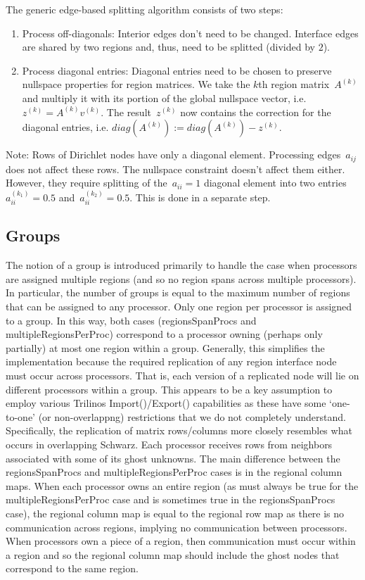 \documentclass[11pt]{article}
\begin{document}
The generic edge-based splitting algorithm consists of two steps:
\begin{enumerate}
\item Process off-diagonals: Interior edges don't need to be changed. 
Interface edges are shared by two regions and, thus, need to be splitted (divided by $2$).
\item Process diagonal entries: Diagonal entries need to be chosen to preserve
nullspace properties for region matrices. We take the $k$th region matrix~$A^{(k)}$ 
and multiply it with its portion of the global nullspace vector, i.e. $z^{(k)} = A^{(k)}v^{(k)}$. 
The result~$z^{(k)}$ now contains the correction for the diagonal entries, i.e. $diag{(A^{(k)})} := diag{(A^{(k)})} - z^{(k)}$.
\end{enumerate}

Note: Rows of Dirichlet nodes have only a diagonal element. Processing edges~$a_{ij}$ does not affect these rows. 
The nullspace constraint doesn't affect them either. However, they require splitting of the~$a_{ii} = 1$ diagonal element 
into two entries~$a_{ii}^{(k_1)} = 0.5$ and~$a_{ii}^{(k_2)} = 0.5$. This is done in a separate step.

\subsection{Groups}
The notion of a group is introduced primarily to handle the case when
processors are assigned multiple regions (and so no region spans
across multiple processors). In particular, the number of groups is
equal to the maximum number of regions that can be assigned to
any processor. Only one region per processor is assigned to a group.
In this way, both cases ({\sf regionsSpanProcs} and
{\sf multipleRegionsPerProc}) correspond to a processor owning (perhaps only
partially) at most one region within a group.
Generally, this simplifies the implementation because the required
replication of any region interface node must occur across processors.
That is, each version of a replicated node will lie on different
processors within a group. This appears to be a key assumption to employ various
Trilinos {\sf Import()}/{\sf Export()} capabilities as these have
some `one-to-one' (or non-overlappng) restrictions that we
do not completely understand.
Specifically, the replication of matrix rows/columns more closely
resembles what occurs in overlapping Schwarz. Each processor
receives rows from neighbors associated with some of its ghost
unknowns. The main difference between the {\sf regionsSpanProcs} and
{\sf multipleRegionsPerProc} cases is in the regional column maps.
When each processor owns an entire region (as must always
be true for the {\sf multipleRegionsPerProc} case and is sometimes
true in the {\sf regionsSpanProcs} case), the regional column map is equal
to the regional row map as there is no communication across regions, implying
no communication between processors. When processors own a piece of
a region, then communication must occur within a region and so
the regional column map should include the ghost nodes that correspond
to the same region.
\end{document}

